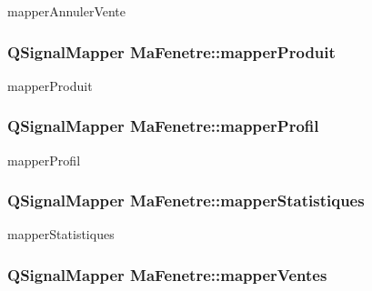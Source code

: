 mapper\-Annuler\-Vente 

\hypertarget{class_ma_fenetre_a7345ec3b89dedf18ae6297d77c5653b4}{
\subsubsection[{mapper\-Produit}]{\setlength{\rightskip}{0pt plus 5cm}Q\-Signal\-Mapper Ma\-Fenetre\-::mapper\-Produit\hspace{0.3cm}{\ttfamily [protected]}}}\label{class_ma_fenetre_a7345ec3b89dedf18ae6297d77c5653b4}


mapper\-Produit 

\hypertarget{class_ma_fenetre_a0629af8324c4d673fe70f55ead4e7b8a}{
\subsubsection[{mapper\-Profil}]{\setlength{\rightskip}{0pt plus 5cm}Q\-Signal\-Mapper Ma\-Fenetre\-::mapper\-Profil\hspace{0.3cm}{\ttfamily [protected]}}}\label{class_ma_fenetre_a0629af8324c4d673fe70f55ead4e7b8a}


mapper\-Profil 

\hypertarget{class_ma_fenetre_ad5133adcd9cb734a07b9534996224d15}{
\subsubsection[{mapper\-Statistiques}]{\setlength{\rightskip}{0pt plus 5cm}Q\-Signal\-Mapper Ma\-Fenetre\-::mapper\-Statistiques\hspace{0.3cm}{\ttfamily [protected]}}}\label{class_ma_fenetre_ad5133adcd9cb734a07b9534996224d15}


mapper\-Statistiques 

\hypertarget{class_ma_fenetre_a68f5911be4ba075ef635413eee34b623}{
\subsubsection[{mapper\-Ventes}]{\setlength{\rightskip}{0pt plus 5cm}Q\-Signal\-Mapper Ma\-Fenetre\-::mapper\-Ventes\hspace{0.3cm}{\ttfamily [protected]}}}\label{class_ma_fenetre_a68f5911be4ba075ef635413eee34b623}



